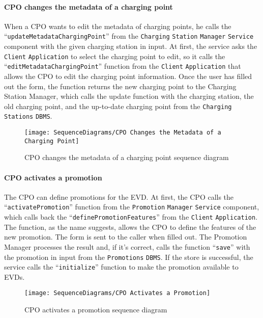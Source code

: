 \paragraph{CPO changes the metadata of a charging point}
When a CPO wants to edit the metadata of charging points, he calls the ``\verb|updateMetadataChargingPoint|'' from the \verb|Charging| \verb|Station| \verb|Manager| \verb|Service| component with the given charging station in input.
At first, the service asks the \verb|Client| \verb|Application| to select the charging point to edit, so it calls the ``\verb|editMetadataChargingPoint|'' function from the \verb|Client| \verb|Application| that allows the CPO to edit the charging point information.
Once the user has filled out the form, the function returns the new charging point to the Charging Station Manager, which calls the update function with the charging station, the old charging point, and the up-to-date charging point from the \verb|Charging| \verb|Stations| \verb|DBMS|\@.
\begin{figure}[H]
    \begin{center}
        \texttt{[image: SequenceDiagrams/CPO Changes the Metadata of a Charging Point]}
        \caption{CPO changes the metadata of a charging point sequence diagram}
        \label{cpo_changes_metadata_of_charging_point}
    \end{center}
\end{figure}

\paragraph{CPO activates a promotion}
The CPO can define promotions for the EVD\@.
At first, the CPO calls the ``\verb|activatePromotion|'' function from the \verb|Promotion| \verb|Manager| \verb|Service| component, which calls back the ``\verb|definePromotionFeatures|'' from the \verb|Client| \verb|Application|.
The function, as the name suggests, allows the CPO to define the features of the new promotion.
The form is sent to the caller when filled out.
The Promotion Manager processes the result and, if it's correct, calls the function ``\verb|save|'' with the promotion in input from the \verb|Promotions| \verb|DBMS|\@.
If the store is successful, the service calls the ``\verb|initialize|'' function to make the promotion available to EVDs\@.
\begin{figure}[H]
    \begin{center}
        \texttt{[image: SequenceDiagrams/CPO Activates a Promotion]}
        \caption{CPO activates a promotion sequence diagram}
        \label{cpo_activates_promotion}
    \end{center}
\end{figure}

